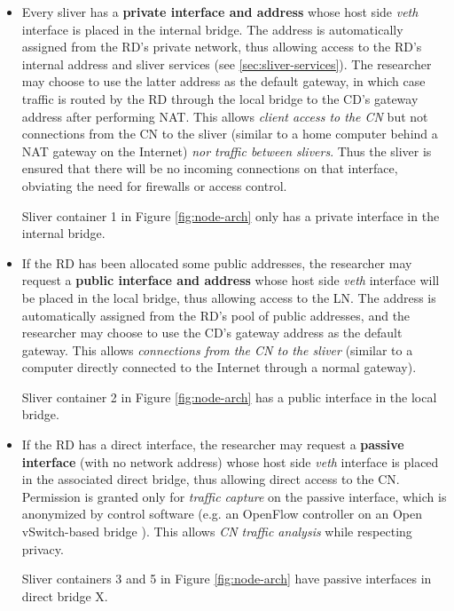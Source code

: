 \documentclass[conference]{IEEEtran}
\begin{document}
\begin{itemize}
\item Every sliver has a \textbf{private interface and address} whose host
  side \emph{veth} interface is placed in the internal bridge.  The address is
  automatically assigned from the RD's private network, thus allowing access
  to the RD's internal address and sliver services (see
  \ref{sec:sliver-services}).  The researcher may choose to use the latter
  address as the default gateway, in which case traffic is routed by the RD
  through the local bridge to the CD's gateway address after performing NAT.
  This allows \emph{client access to the CN} but not connections from the CN
  to the sliver (similar to a home computer behind a NAT gateway on the
  Internet) \emph{nor traffic between slivers}.  Thus the sliver is ensured
  that there will be no incoming connections on that interface, obviating the
  need for firewalls or access control.

  Sliver container 1 in Figure \ref{fig:node-arch} only has a private
  interface in the internal bridge.

\item If the RD has been allocated some public addresses, the researcher may
  request a \textbf{public interface and address} whose host side \emph{veth}
  interface will be placed in the local bridge, thus allowing access to the
  LN.  The address is automatically assigned from the RD's pool of public addresses, and
  the researcher may choose to use the CD's gateway address as the default
  gateway.  This allows \emph{connections from the CN to the sliver} (similar
  to a computer directly connected to the Internet through a normal gateway).

  Sliver container 2 in Figure \ref{fig:node-arch} has a public interface in
  the local bridge.

\item If the RD has a direct interface, the researcher may request a
  \textbf{passive interface} (with no network address) whose host side \emph{veth}
  interface is placed in the associated direct bridge, thus allowing direct
  access to the CN.  Permission is granted only for \emph{traffic capture} on
  the passive interface, which is anonymized by control software (e.g. an
  OpenFlow controller%
  on an Open vSwitch-based bridge
  \cite{open-vswitch}).  This allows \emph{CN traffic analysis} while
  respecting privacy.

  Sliver containers 3 and 5 in Figure \ref{fig:node-arch} have passive
  interfaces in direct bridge X.


\end{itemize}
\end{document}
